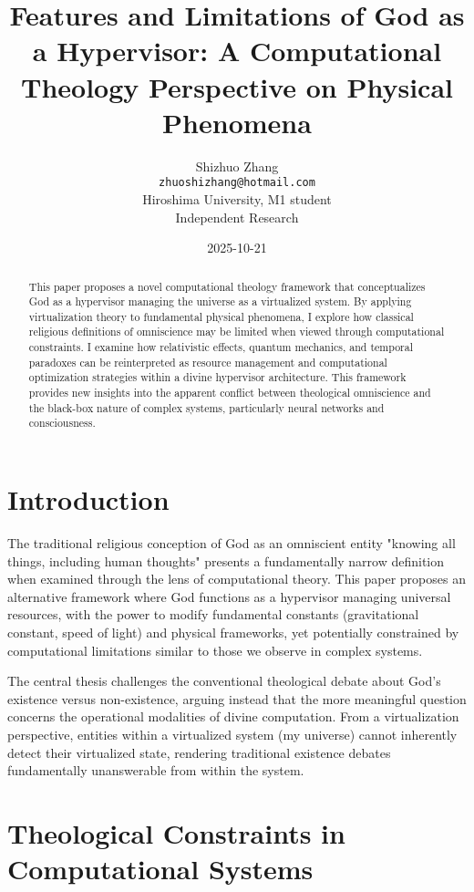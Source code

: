 \documentclass[12pt,a4paper]{article}
\title{Features and Limitations of God as a Hypervisor: A Computational Theology Perspective on Physical Phenomena}
\author{Shizhuo Zhang\\
\texttt{zhuoshizhang@hotmail.com}\\
Hiroshima University, M1 student\\
Independent Research}
\date{2025-10-21}
\begin{document}
\maketitle

\begin{abstract}
This paper proposes a novel computational theology framework that conceptualizes God as a hypervisor managing the universe as a virtualized system. By applying virtualization theory to fundamental physical phenomena, I explore how classical religious definitions of omniscience may be limited when viewed through computational constraints. I examine how relativistic effects, quantum mechanics, and temporal paradoxes can be reinterpreted as resource management and computational optimization strategies within a divine hypervisor architecture. This framework provides new insights into the apparent conflict between theological omniscience and the black-box nature of complex systems, particularly neural networks and consciousness.
\end{abstract}

\section{Introduction}

The traditional religious conception of God as an omniscient entity "knowing all things, including human thoughts" presents a fundamentally narrow definition when examined through the lens of computational theory. This paper proposes an alternative framework where God functions as a hypervisor managing universal resources, with the power to modify fundamental constants (gravitational constant, speed of light) and physical frameworks, yet potentially constrained by computational limitations similar to those we observe in complex systems.

The central thesis challenges the conventional theological debate about God's existence versus non-existence, arguing instead that the more meaningful question concerns the operational modalities of divine computation. From a virtualization perspective, entities within a virtualized system (my universe) cannot inherently detect their virtualized state, rendering traditional existence debates fundamentally unanswerable from within the system.

\section{Theological Constraints in Computational Systems}
\end{document}
